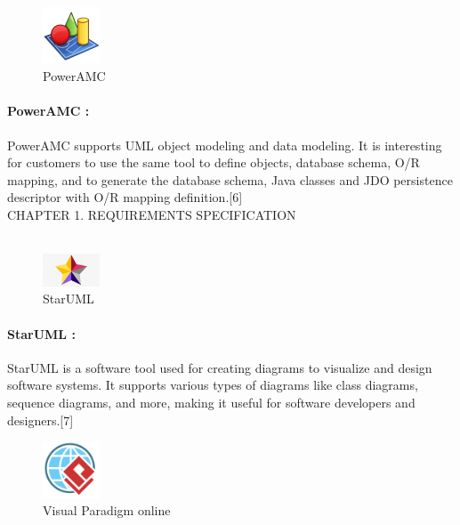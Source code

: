\documentclass{article}
\begin{document}
\begin{figure}[htbp]
    \centering
    \includegraphics[width=0.15\textwidth]{slm}
    \caption{PowerAMC }
    \label{fig:design6}
\end{figure}
\paragraph{PowerAMC :} 
PowerAMC supports UML object modeling and data modeling. It is interesting for customers to use the same tool to define objects, database schema, O/R mapping, and to generate the database schema, Java classes and JDO persistence descriptor with O/R mapping definition.[6]\vspace{1cm}\\
\newpage
\noindent
CHAPTER 1.  REQUIREMENTS SPECIFICATION \\
\underline{\hspace{\textwidth}} \vspace{0.2cm}\\

\begin{figure}[htbp]
    \centering
    \includegraphics[width=0.15\textwidth]{StarUml}
    \caption{StarUML }
    \label{fig:design6}
\end{figure}
\paragraph{StarUML :} 
StarUML is a software tool used for creating diagrams to visualize and design software systems. It supports various types of diagrams like class diagrams, sequence diagrams, and more, making it useful for software developers and designers.[7]\vspace{1cm}\\




\begin{figure}[htbp]
    \centering
    \includegraphics[width=0.15\textwidth]{parad}
    \caption{Visual Paradigm online }
    \label{fig:design6}
\end{figure}
\end{document}
